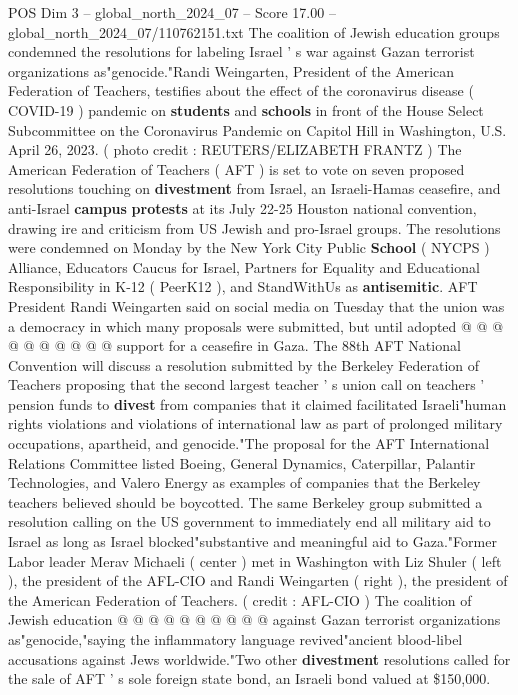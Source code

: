 \begin{textsample}{POS Dim 3 – global\_north\_2024\_07 – Score 17.00 – global\_north\_2024\_07/110762151.txt}  \label{ex:f3_pos_088}
The coalition of Jewish education groups condemned the resolutions for labeling Israel ' s war against Gazan terrorist organizations as"genocide."Randi Weingarten, President of the American Federation of Teachers, testifies about the effect of the coronavirus disease ( COVID-19 ) pandemic on \textbf{students} and \textbf{schools} in front of the House Select Subcommittee on the Coronavirus Pandemic on Capitol Hill in Washington, U.S.
April 26, 2023. ( photo credit : REUTERS/ELIZABETH FRANTZ ) The American Federation of Teachers ( AFT ) is set to vote on seven proposed resolutions touching on \textbf{divestment} from Israel, an Israeli-Hamas ceasefire, and anti-Israel \textbf{campus} \textbf{protests} at its July 22-25 Houston national convention, drawing ire and criticism from US Jewish and pro-Israel groups.
The resolutions were condemned on Monday by the New York City Public \textbf{School} ( NYCPS ) Alliance, Educators Caucus for Israel, Partners for Equality and Educational Responsibility in K-12 ( PeerK12 ), and StandWithUs as \textbf{antisemitic}.
AFT President Randi Weingarten said on social media on Tuesday that the union was a democracy in which many proposals were submitted, but until adopted @ @ @ @ @ @ @ @ @ @ support for a ceasefire in Gaza.
The 88th AFT National Convention will discuss a resolution submitted by the Berkeley Federation of Teachers proposing that the second largest teacher ' s union call on teachers ' pension funds to \textbf{divest} from companies that it claimed facilitated Israeli"human rights violations and violations of international law as part of prolonged military occupations, apartheid, and genocide."The proposal for the AFT International Relations Committee listed Boeing, General Dynamics, Caterpillar, Palantir Technologies, and Valero Energy as examples of companies that the Berkeley teachers believed should be boycotted.
The same Berkeley group submitted a resolution calling on the US government to immediately end all military aid to Israel as long as Israel blocked"substantive and meaningful aid to Gaza."Former Labor leader Merav Michaeli ( center ) met in Washington with Liz Shuler ( left ), the president of the AFL-CIO and Randi Weingarten ( right ), the president of the American Federation of Teachers. ( credit : AFL-CIO ) The coalition of Jewish education @ @ @ @ @ @ @ @ @ @ against Gazan terrorist organizations as"genocide,"saying the inflammatory language revived"ancient blood-libel accusations against Jews worldwide."Two other \textbf{divestment} resolutions called for the sale of AFT ' s sole foreign state bond, an Israeli bond valued at \$150,000.

\end{textsample}
